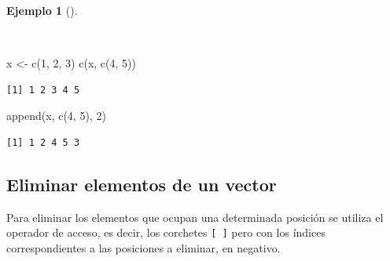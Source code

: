 \documentclass[
  a4paper,
]{scrreport}
\newenvironment{Shaded}{\begin{snugshade}}{\end{snugshade}}
\newcommand{\DecValTok}[1]{\textcolor[rgb]{0.68,0.00,0.00}{#1}}
\newcommand{\FunctionTok}[1]{\textcolor[rgb]{0.28,0.35,0.67}{#1}}
\newcommand{\NormalTok}[1]{\textcolor[rgb]{0.00,0.23,0.31}{#1}}
\newcommand{\OtherTok}[1]{\textcolor[rgb]{0.00,0.23,0.31}{#1}}
\theoremstyle{definition}
\theoremstyle{definition}
\newtheorem{example}{Ejemplo}[chapter]
\theoremstyle{remark}
\begin{document}
\begin{example}[]\protect\hypertarget{exm-añadir-elementos-vector}{}\label{exm-añadir-elementos-vector}

~

\begin{Shaded}
\begin{Highlighting}[]
\NormalTok{x }\OtherTok{\textless{}{-}} \FunctionTok{c}\NormalTok{(}\DecValTok{1}\NormalTok{, }\DecValTok{2}\NormalTok{, }\DecValTok{3}\NormalTok{)}
\FunctionTok{c}\NormalTok{(x, }\FunctionTok{c}\NormalTok{(}\DecValTok{4}\NormalTok{, }\DecValTok{5}\NormalTok{))}
\end{Highlighting}
\end{Shaded}

\begin{verbatim}
[1] 1 2 3 4 5
\end{verbatim}

\begin{Shaded}
\begin{Highlighting}[]
\FunctionTok{append}\NormalTok{(x, }\FunctionTok{c}\NormalTok{(}\DecValTok{4}\NormalTok{, }\DecValTok{5}\NormalTok{), }\DecValTok{2}\NormalTok{)}
\end{Highlighting}
\end{Shaded}

\begin{verbatim}
[1] 1 2 4 5 3
\end{verbatim}

\end{example}

\hypertarget{eliminar-elementos-de-un-vector}{%
\subsection{Eliminar elementos de un
vector}\label{eliminar-elementos-de-un-vector}}

Para eliminar los elementos que ocupan una determinada posición se
utiliza el operador de acceso, es decir, los corchetes \texttt{{[}\ {]}}
pero con los índices correspondientes a las posiciones a eliminar, en
negativo.
\end{document}
